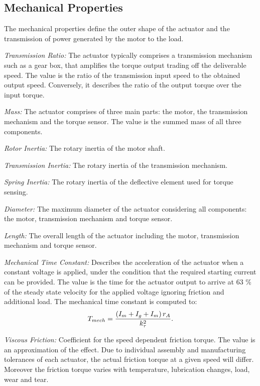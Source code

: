 \documentclass[a4paper,10pt]{cjtdsheet}      %
\begin{document}
\begin{multicols}{2}

%
%
\subsection*{Mechanical Properties}
The mechanical properties define the outer shape of the actuator and the transmission of power generated by the motor to the load.

\emph{Transmission Ratio:} The actuator typically comprises a transmission mechanism such as a gear box, that amplifies the torque output trading off the deliverable speed. The value is the ratio of the transmission input speed to the obtained output speed. Conversely, it describes the ratio of the output torque over the input torque.

\emph{Mass:} The actuator comprises of three main parts: the motor, the transmission mechanism and the torque sensor. The value is the summed mass of all three components.

\emph{Rotor Inertia:} The rotary inertia of the motor shaft.

\emph{Transmission Inertia:} The rotary inertia of the transmission mechanism.

\emph{Spring Inertia:} The rotary inertia of the deflective element used for torque sensing.

\emph{Diameter:} The maximum diameter of the actuator considering all components: the motor, transmission mechanism and torque sensor.

\emph{Length:} The overall length of the actuator including the motor, transmission mechanism and torque sensor.

\emph{Mechanical Time Constant:} Describes the acceleration of the actuator when a constant voltage is applied, under the condition that the required starting current can be provided. The value is the time for the actuator output to arrive at 63 \% of the steady state velocity for the applied voltage ignoring friction and additional load. The mechanical time constant is computed to:
\begin{equation}
T_{mech} = \frac{
	\left(
		  I_m 
		+ I_g 
		+ I_m
	\right)
	r_A
	}
	{
	 k_\tau^2
	}.
\end{equation}

\emph{Viscous Friction:} Coefficient for the speed dependent friction torque. The value is an approximation of the effect. Due to individual assembly and manufacturing tolerances of each actuator, the actual friction torque at a given speed will differ. Moreover the friction torque varies with temperature, lubrication changes, load, wear and tear.


\end{multicols}
\end{document}
